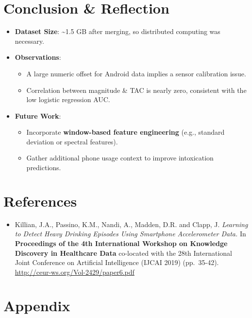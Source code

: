 \documentclass[
  letterpaper,
  DIV=11,
  numbers=noendperiod]{scrartcl}
\providecommand{\tightlist}{%
  \setlength{\itemsep}{0pt}\setlength{\parskip}{0pt}}\usepackage{longtable,booktabs,array}
\begin{document}
\section{Conclusion \& Reflection}\label{conclusion-reflection}

\begin{itemize}
\tightlist
\item
  \textbf{Dataset Size}: \textasciitilde1.5 GB after merging, so
  distributed computing was necessary.
\item
  \textbf{Observations}:

  \begin{itemize}
  \tightlist
  \item
    A large numeric offset for Android data implies a sensor calibration
    issue.
  \item
    Correlation between magnitude \& TAC is nearly zero, consistent with
    the low logistic regression AUC.
  \end{itemize}
\item
  \textbf{Future Work}:

  \begin{itemize}
  \tightlist
  \item
    Incorporate \textbf{window-based feature engineering} (e.g.,
    standard deviation or spectral features).
  \item
    Gather additional phone usage context to improve intoxication
    predictions.
  \end{itemize}
\end{itemize}

\section{References}\label{references}

\begin{itemize}
\tightlist
\item
  Killian, J.A., Passino, K.M., Nandi, A., Madden, D.R. and Clapp, J.
  \emph{Learning to Detect Heavy Drinking Episodes Using Smartphone
  Accelerometer Data.} In \textbf{Proceedings of the 4th International
  Workshop on Knowledge Discovery in Healthcare Data} co-located with
  the 28th International Joint Conference on Artificial Intelligence
  (IJCAI 2019) (pp.~35-42). \url{http://ceur-ws.org/Vol-2429/paper6.pdf}
\end{itemize}

\section{Appendix}\label{appendix}
\end{document}
